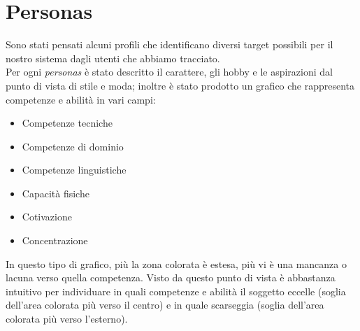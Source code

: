 \documentclass[12pt,a4paper]{report}
\begin{document}
\section{Personas}
Sono stati pensati alcuni profili che identificano diversi target possibili per il nostro sistema dagli utenti che abbiamo tracciato.\\
Per ogni \textit{personas} è stato descritto il carattere, gli hobby e le aspirazioni dal punto di vista di stile e moda; inoltre è stato prodotto un grafico che rappresenta competenze e abilità in vari campi:
\begin{itemize}
  \item Competenze tecniche
  \item Competenze di dominio
  \item Competenze linguistiche
  \item Capacità fisiche
  \item Cotivazione
  \item Concentrazione
\end{itemize}
In questo tipo di grafico, più la zona colorata è estesa, più vi è una mancanza o lacuna verso quella competenza. Visto da questo punto di vista è abbastanza intuitivo per individuare in quali competenze e abilità il soggetto eccelle (soglia dell'area colorata più verso il centro) e in quale scarseggia (soglia dell'area colorata più verso l'esterno).
\end{document}
